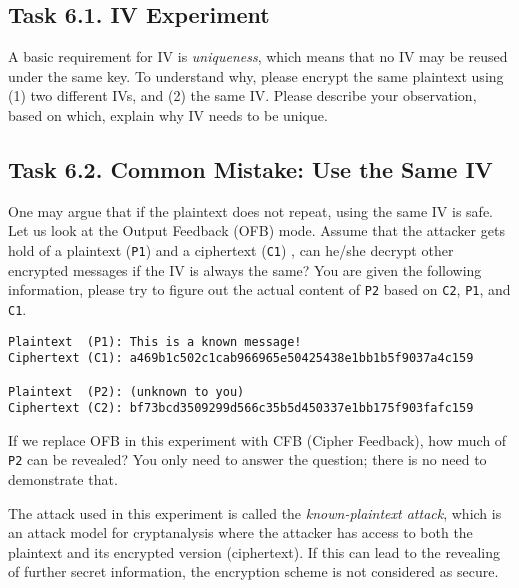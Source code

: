\subsection{Task 6.1. IV Experiment} 

A basic requirement for IV is \textit{uniqueness},
which means that no IV may be reused under the same key. To understand why,
please encrypt the same plaintext using (1) two different IVs, and (2)
the same IV. Please describe your observation, based on which, explain why
IV needs to be unique.   



\subsection{Task 6.2. Common Mistake: Use the Same IV} 

One may argue that if the plaintext does not repeat, using 
the same IV is safe. Let us look at the Output Feedback (OFB) mode. 
Assume that the attacker gets hold of a plaintext (\texttt{P1})  
and a ciphertext (\texttt{C1}) , 
can he/she decrypt other encrypted messages if the IV is always the same? 
You are given the following information, please try to figure out
the actual content of \texttt{P2} based on \texttt{C2}, \texttt{P1},
and \texttt{C1}. 


\begin{lstlisting}
Plaintext  (P1): This is a known message!
Ciphertext (C1): a469b1c502c1cab966965e50425438e1bb1b5f9037a4c159

Plaintext  (P2): (unknown to you)
Ciphertext (C2): bf73bcd3509299d566c35b5d450337e1bb175f903fafc159
\end{lstlisting}
 
If we replace OFB in this experiment with 
CFB (Cipher Feedback), how much of \texttt{P2} can be revealed? You
only need to answer the question; there is no need to demonstrate that.

The attack used in this experiment is called the \textit{known-plaintext
attack}, which is an attack model for cryptanalysis where the
attacker has access to both the plaintext and its
encrypted version (ciphertext). If this can lead to
the revealing of further secret information, the encryption scheme is 
not considered as secure. 


